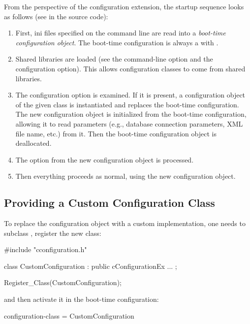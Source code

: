 From the perspective of the configuration extension, the startup sequence
looks as follows (see  in the source code):

\begin{enumerate}
  \item First, ini files specified on the command line are read into a
     \textit{boot-time configuration object}. The boot-time configuration
     is always a  with
     .
  \item Shared libraries are loaded (see the  command-line option
     and the  configuration option). This allows
     configuration classes to come from shared libraries.
  \item The  configuration option is examined.
     If it is present, a configuration object of the given class
     is instantiated and replaces the boot-time configuration.
     The new configuration object is initialized from the boot-time
     configuration, allowing it to read parameters (e.g., database
     connection parameters, XML file name, etc.) from it.
     Then the boot-time configuration object is deallocated.
  \item The  option from the new configuration object is
     processed.
  \item Then everything proceeds as normal, using the new configuration
     object.
\end{enumerate}

\subsection{Providing a Custom Configuration Class}
\label{sec:plugin-exts:configprovider:custom-class}

To replace the configuration object with a custom implementation,
one needs to subclass , register the new class:

\begin{cpp}
#include "cconfiguration.h"

class CustomConfiguration : public cConfigurationEx
{
   ...
};

Register_Class(CustomConfiguration);
\end{cpp}

and then activate it in the boot-time configuration:

\begin{inifile}
[General]
configuration-class = CustomConfiguration
\end{inifile}


